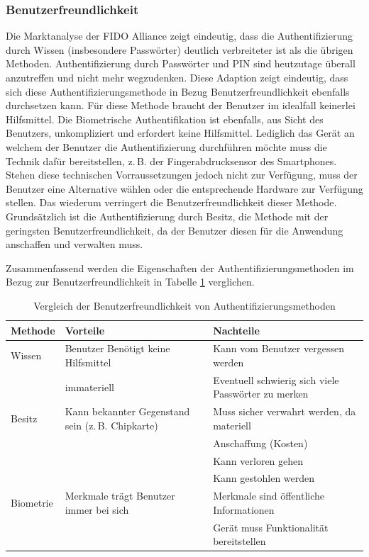 \documentclass[11pt,a4paper,ngerman]{scrreprt}
\begin{document}
\subsubsection{Benutzerfreundlichkeit}
Die Marktanalyse der FIDO Alliance \cite{fido17} zeigt eindeutig, dass die Authentifizierung durch Wissen (insbesondere Passwörter) deutlich verbreiteter ist als die übrigen Methoden. Authentifizierung durch Passwörter und PIN sind heutzutage überall anzutreffen und nicht mehr wegzudenken. Diese Adaption zeigt eindeutig, dass sich diese Authentifizierungsmethode in Bezug Benutzerfreundlichkeit ebenfalls durchsetzen kann. Für diese Methode braucht der Benutzer im idealfall keinerlei Hilfsmittel. Die Biometrische Authentifikation ist ebenfalls, aus Sicht des Benutzers, unkompliziert und erfordert keine Hilfsmittel. Lediglich das Gerät an welchem der Benutzer die Authentifizierung durchführen möchte muss die Technik dafür bereitstellen, z.\,B. der Fingerabdrucksensor des Smartphones. Stehen diese technischen Vorraussetzungen jedoch nicht zur Verfügung, muss der Benutzer eine Alternative wählen oder die entsprechende Hardware zur Verfügung stellen. Das wiederum verringert die Benutzerfreundlichkeit dieser Methode. Grundsätzlich ist die Authentifizierung durch Besitz, die Methode mit der geringsten Benutzerfreundlichkeit, da der Benutzer diesen für die Anwendung anschaffen und verwalten muss. 

Zusammenfassend werden die Eigenschaften der Authentifizierungsmethoden im Bezug zur Benutzerfreundlichkeit in Tabelle \ref{table:Benutzerfreundlichkeit} verglichen.
\begin{table}[htbp]
    \begin{tabularx}{\textwidth}{ lXX }
        \toprule
        Methode & Vorteile & Nachteile \\ 
        \midrule
        Wissen & Benutzer Benötigt keine Hilfsmittel & Kann vom Benutzer vergessen werden \\
         & immateriell & Eventuell schwierig sich viele Passwörter zu merken \\
        \midrule
        Besitz & Kann bekannter Gegenstand sein (z.\,B. Chipkarte) & Muss sicher verwahrt werden, da materiell \\
         & & Anschaffung (Kosten) \\
         & & Kann verloren gehen \\
         & & Kann gestohlen werden \\
        \midrule
        Biometrie & Merkmale trägt Benutzer immer bei sich & Merkmale sind öffentliche Informationen \\
         & & Gerät muss Funktionalität bereitstellen \\
        \bottomrule
    \end{tabularx}
    \caption{Vergleich der Benutzerfreundlichkeit von Authentifizierungsmethoden}
    \label{table:Benutzerfreundlichkeit}
\end{table}
\end{document}
